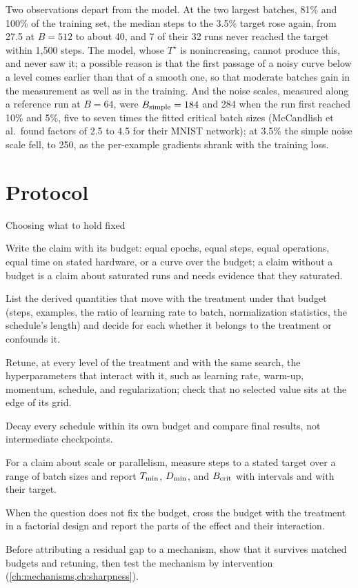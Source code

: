\begin{refsection}
Two observations depart from the model. At the two largest batches, 81\% and 100\% of the training set, the median steps to the 3.5\% target rose again, from 27.5 at $B=512$ to about 40, and 7 of their 32 runs never reached the target within 1,500 steps. The model, whose $T^\star$ is nonincreasing, cannot produce this, and \textcite{ShallueEtAl2019} never saw it; a possible reason is that the first passage of a noisy curve below a level comes earlier than that of a smooth one, so that moderate batches gain in the measurement as well as in the training. And the noise scales, measured along a reference run at $B=64$, were $B_{\mathrm{simple}}=184$ and 284 when the run first reached 10\% and 5\%, five to seven times the fitted critical batch sizes (McCandlish et al.\ found factors of 2.5 to 4.5 for their MNIST network); at 3.5\% the simple noise scale fell, to 250, as the per-example gradients shrank with the training loss.

\section{Protocol}\label{sec:heldfixed:protocol}

\begin{protocol}{Choosing what to hold fixed}\label{prot:heldfixed:fixed}
\item Write the claim with its budget: equal epochs, equal steps, equal operations, equal time on stated hardware, or a curve over the budget; a claim without a budget is a claim about saturated runs and needs evidence that they saturated.
\item List the derived quantities that move with the treatment under that budget (steps, examples, the ratio of learning rate to batch, normalization statistics, the schedule's length) and decide for each whether it belongs to the treatment or confounds it.
\item Retune, at every level of the treatment and with the same search, the hyperparameters that interact with it, such as learning rate, warm-up, momentum, schedule, and regularization; check that no selected value sits at the edge of its grid.
\item Decay every schedule within its own budget and compare final results, not intermediate checkpoints.
\item For a claim about scale or parallelism, measure steps to a stated target over a range of batch sizes and report $T_{\min}$, $D_{\min}$, and $B_{\mathrm{crit}}$ with intervals and with their target.
\item When the question does not fix the budget, cross the budget with the treatment in a factorial design and report the parts of the effect and their interaction.
\item Before attributing a residual gap to a mechanism, show that it survives matched budgets and retuning, then test the mechanism by intervention (\cref{ch:mechanisms,ch:sharpness}).
\end{protocol}


\end{refsection}
